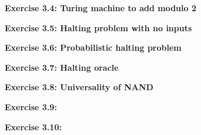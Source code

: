 \documentclass{article}
\begin{document}
\bigskip

\begin{framed}
    \noindent \textbf{Exercise 3.4: Turing machine to add modulo 2}
    
    \medskip
    
    
\end{framed}

\bigskip

\begin{framed}
    \noindent \textbf{Exercise 3.5: Halting problem with no inputs}
    
    \medskip
    
    
\end{framed}

\bigskip

\begin{framed}
    \noindent \textbf{Exercise 3.6: Probabilistic halting problem}
    
    \medskip
    
    
\end{framed}

\bigskip

\begin{framed}
    \noindent \textbf{Exercise 3.7: Halting oracle}
    
    \medskip
    
    
\end{framed}

\bigskip

\begin{framed}
    \noindent \textbf{Exercise 3.8: Universality of NAND}
    
    \medskip
    
    
\end{framed}

\bigskip

\begin{framed}
    \noindent \textbf{Exercise 3.9: }
    
    \medskip
    
    
\end{framed}

\bigskip

\begin{framed}
    \noindent \textbf{Exercise 3.10: }
    
    \medskip
    
    
\end{framed}

\bigskip
\end{document}
